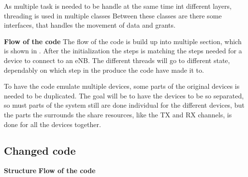 

As multiple task is needed to be handle at the same time int different layers, threading is used in multiple classes  Between these classes are there some interfaces, that handles the movement of data and grants.

\textbf{Flow of the code}
The flow of the code is build up into multiple section, which is shown in . After the initialization the steps is matching the steps needed for a device to connect to an eNB. The different threads will go to different state, dependably on which step in the produce the code have made it to.



To have the code emulate multiple devices, some parts of the original devices is needed to be duplicated. The goal will be to have the devices to be so separated, so must parts of the system still are done individual for the different devices, but the parts the surrounds the share resources, like the TX and RX channels, is done for all the devices together.

\subsection{Changed code}

\textbf{Structure}
\textbf{Flow of the code}